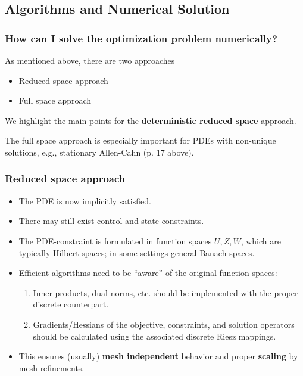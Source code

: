 \documentclass[aspectratio=169,xcolor=dvipsnames,10pt]{beamer}
\begin{document}
\subsection{Algorithms and Numerical Solution}
\begin{frame}\frametitle{How can I solve the optimization problem numerically?}
\begin{block}{}
As mentioned above, there are two approaches
\begin{itemize}
\item Reduced space approach
\item Full space approach
\end{itemize}
\end{block}

\begin{block}{}\centering
We highlight the main points for the \textbf{deterministic reduced space} approach.
\end{block}

\begin{block}{}\centering
The full space approach is especially important for PDEs with non-unique solutions, e.g., stationary Allen-Cahn (p. 17 above).
\end{block}
\end{frame}

\begin{frame}\frametitle{Reduced space approach}
\begin{block}{}
\begin{itemize}
\item The PDE is now implicitly satisfied. 
\item There may still exist control and state constraints.
\item The PDE-constraint is formulated in function spaces $U, Z, W$, which are typically Hilbert spaces; in some settings general Banach spaces.
\item Efficient algorithms need to be ``aware'' of the original function spaces:
\begin{enumerate}
\item Inner products, dual norms, etc. should be implemented with the proper discrete counterpart.
\item Gradients/Hessians of the objective, constraints, and solution operators should be calculated using the associated discrete Riesz mappings.
\end{enumerate}
\item This ensures (usually) \textbf{mesh independent} behavior and proper \textbf{scaling} by mesh refinements.
\end{itemize}
\end{block}
\end{frame}
\end{document}
